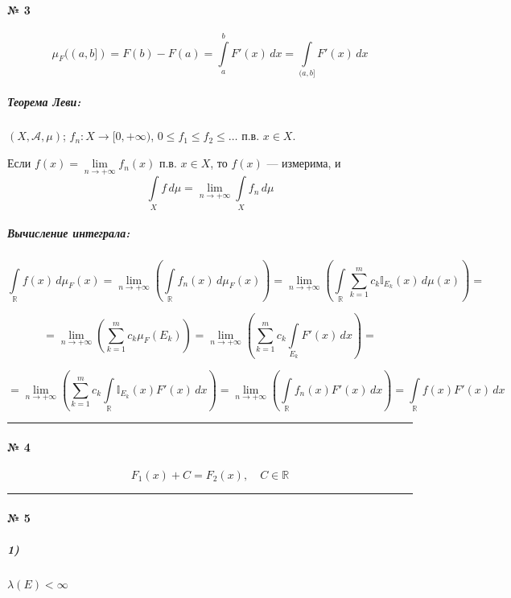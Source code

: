 \documentclass[11pt, a4paper]{article}
\begin{document}
\paragraph{№ 3}

$$
\mu_F((a, b]) = F(b) - F(a) = \int\limits_a^b F'(x)\,dx = \int\limits_{(a, b]} F'(x)\,dx
$$

\subparagraph{Теорема Леви:}
$(X, \mathcal{A}, \mu)$; $f_n \colon X \to [0, +\infty)$, $0 \leqslant f_1 \leqslant f_2 \leqslant \dots$ п.в. $x \in X$.

Если $f(x) = \lim\limits_{n \to +\infty} f_n(x)$ п.в. $x \in X$, то $f(x)$ --- измерима, и
$$
\int\limits_X f\,d\mu = \lim\limits_{n \to +\infty} \int\limits_X f_n\,d\mu
$$

\bigskip

\subparagraph{Вычисление интеграла:}

$$
\int\limits_{\mathbb{R}} f(x)\,d\mu_F(x) = \lim\limits_{n \to +\infty} \left( \int\limits_{\mathbb{R}} f_n(x)\,d\mu_F(x) \right) = \lim\limits_{n \to +\infty} \left( \int\limits_{\mathbb{R}} \sum_{k=1}^m c_k \mathbb{I}_{E_k}(x)\,d\mu(x) \right) =
$$

$$
= \lim\limits_{n \to +\infty} \left( \sum_{k=1}^m c_k \mu_F(E_k) \right) = \lim\limits_{n \to +\infty} \left( \sum_{k=1}^m c_k \int\limits_{E_k} F'(x)\,dx \right) =
$$

$$
= \lim\limits_{n \to +\infty} \left( \sum_{k=1}^m c_k \int\limits_{\mathbb{R}} \mathbb{I}_{E_k}(x) F'(x)\,dx \right) = \lim\limits_{n \to +\infty} \left( \int\limits_{\mathbb{R}} f_n(x) F'(x)\,dx \right) = \int\limits_{\mathbb{R}} f(x) F'(x)\,dx
$$

\vspace{1.5em}
\hrule
\vspace{1.5em}

\paragraph{№ 4}

$$
F_1(x) + C = F_2(x), \quad C \in \mathbb{R}
$$

\vspace{1.5em}
\hrule
\vspace{1.5em}

\paragraph{№ 5}

\subparagraph{1)}
$\lambda(E) < \infty$
\end{document}
